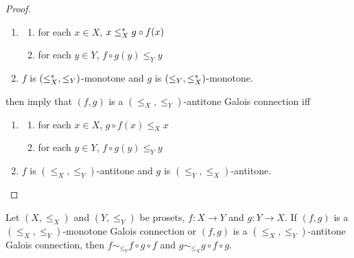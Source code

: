 \documentclass{book}
\begin{document}
\begin{proof}
\begin{enumerate}
			\begin{enumerate}
				\item 
				\begin{enumerate}
					\item for each $x \in X$, $x \leq^*_X g \circ f (x)$
					\item for each $y \in Y$, $f \circ g (y) \leq_Y y$
				\end{enumerate}
				\item $f$ is $(\leq^*_X, \leq_Y)$-monotone and $g$ is $(\leq_Y, \leq^*_X)$-monotone.
			\end{enumerate}
			 then imply that $(f,g)$ is a $(\leq_X, \leq_Y)$-antitone Galois connection iff 
			\begin{enumerate}
				\item 
				\begin{enumerate}
					\item for each $x \in X$, $g \circ f (x) \leq_X x$
					\item for each $y \in Y$, $f \circ g (y) \leq_Y y$
				\end{enumerate}
				\item $f$ is $(\leq_X, \leq_Y)$-antitone and $g$ is $(\leq_Y, \leq_X)$-antitone.
			\end{enumerate}
		\end{enumerate}
	\end{proof}
	
	\begin{ex} 
		Let $(X, \leq_X)$ and $(Y, \leq_Y)$ be prosets, $f: X \rightarrow Y$ and $g:Y \rightarrow X$. If $(f,g)$ is a $(\leq_X, \leq_Y)$-monotone Galois connection or $(f,g)$ is a $(\leq_X, \leq_Y)$-antitone Galois connection, then $f \sim_{\leq_Y} f \circ g \circ f$ and $g \sim_{\leq_X} g \circ f \circ g$.
	\end{ex}
	
\end{document}
